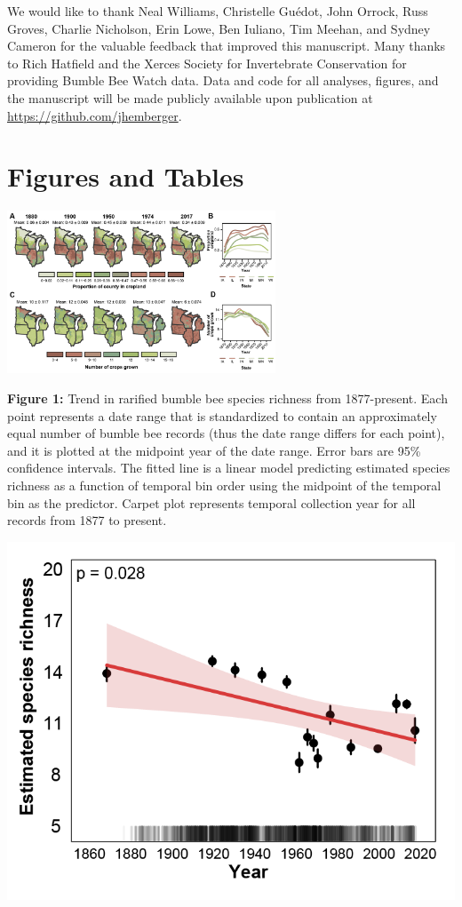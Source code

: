 \documentclass[11pt,]{article}
\begin{document}
We would like to thank Neal Williams, Christelle Guédot, John Orrock,
Russ Groves, Charlie Nicholson, Erin Lowe, Ben Iuliano, Tim Meehan, and
Sydney Cameron for the valuable feedback that improved this manuscript.
Many thanks to Rich Hatfield and the Xerces Society for Invertebrate
Conservation for providing Bumble Bee Watch data. Data and code for all
analyses, figures, and the manuscript will be made publicly available
upon publication at \url{https://github.com/jhemberger}. \clearpage

\newpage

\hypertarget{figures-and-tables}{%
\section{Figures and Tables}\label{figures-and-tables}}

\includegraphics[width=0.6\textwidth,height=\textheight]{../ms_figs/fig1.png}

\textbf{Figure 1:} Trend in rarified bumble bee species richness from
1877-present. Each point represents a date range that is standardized to
contain an approximately equal number of bumble bee records (thus the
date range differs for each point), and it is plotted at the midpoint
year of the date range. Error bars are 95\% confidence intervals. The
fitted line is a linear model predicting estimated species richness as a
function of temporal bin order using the midpoint of the temporal bin as
the predictor. Carpet plot represents temporal collection year for all
records from 1877 to present.

\clearpage

\newpage

\includegraphics[width=1\textwidth,height=\textheight]{../ms_figs/fig2.png}
\end{document}
